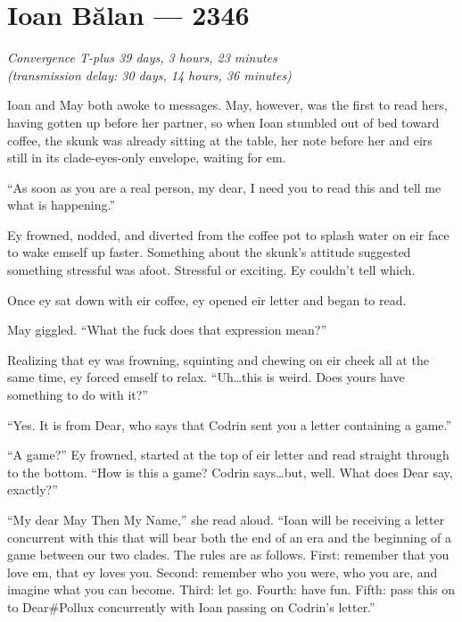 \hypertarget{ioan-bux103lan-2346}{%
\chapter{Ioan Bălan — 2346}}

\begin{center}
\emph{Convergence T-plus 39 days, 3 hours, 23 minutes}\\
\emph{(transmission delay: 30 days, 14 hours, 36 minutes)}
\end{center}

\noindent Ioan and May both awoke to messages. May, however, was the first to read hers, having gotten up before her partner, so when Ioan stumbled out of bed toward coffee, the skunk was already sitting at the table, her note before her and eirs still in its clade-eyes-only envelope, waiting for em.

``As soon as you are a real person, my dear, I need you to read this and tell me what is happening.''

Ey frowned, nodded, and diverted from the coffee pot to splash water on eir face to wake emself up faster. Something about the skunk's attitude suggested something stressful was afoot. Stressful or exciting. Ey couldn't tell which.

Once ey sat down with eir coffee, ey opened eir letter and began to read.

May giggled. ``What the fuck does that expression mean?''

Realizing that ey was frowning, squinting and chewing on eir cheek all at the same time, ey forced emself to relax. ``Uh\ldots this is weird. Does yours have something to do with it?''

``Yes. It is from Dear, who says that Codrin sent you a letter containing a game.''

``A game?'' Ey frowned, started at the top of eir letter and read straight through to the bottom. ``How is this a game? Codrin says\ldots but, well. What does Dear say, exactly?''

``My dear May Then My Name,'' she read aloud. ``Ioan will be receiving a letter concurrent with this that will bear both the end of an era and the beginning of a game between our two clades. The rules are as follows. First: remember that you love em, that ey loves you. Second: remember who you were, who you are, and imagine what you can become. Third: let go. Fourth: have fun. Fifth: pass this on to Dear\#Pollux concurrently with Ioan passing on Codrin's letter.''

